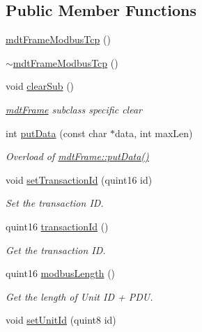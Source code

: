 \subsection*{Public Member Functions}
\begin{DoxyCompactItemize}
\item 
\hyperlink{classmdt_frame_modbus_tcp_a63e62f8cf28e0a1f4056517cbea2fa65}{mdt\-Frame\-Modbus\-Tcp} ()
\item 
\hyperlink{classmdt_frame_modbus_tcp_acebda30f8c392b14338eabc7580f286a}{$\sim$mdt\-Frame\-Modbus\-Tcp} ()
\item 
void \hyperlink{classmdt_frame_modbus_tcp_ab1545b25b4c8864056d900c8ddce2719}{clear\-Sub} ()
\begin{DoxyCompactList}\small\item\em \hyperlink{classmdt_frame}{mdt\-Frame} subclass specific clear \end{DoxyCompactList}\item 
int \hyperlink{classmdt_frame_modbus_tcp_a0f684d77c03e5fb91598c9a10715bedb}{put\-Data} (const char $\ast$data, int max\-Len)
\begin{DoxyCompactList}\small\item\em Overload of \hyperlink{classmdt_frame_ae63af784d2fc54430ea5db4dc80b7ec8}{mdt\-Frame\-::put\-Data()} \end{DoxyCompactList}\item 
void \hyperlink{classmdt_frame_modbus_tcp_a3c5528d2e45111ec0563dfd3350177cd}{set\-Transaction\-Id} (quint16 id)
\begin{DoxyCompactList}\small\item\em Set the transaction I\-D. \end{DoxyCompactList}\item 
quint16 \hyperlink{classmdt_frame_modbus_tcp_a48a7e24190190da0ae9f5dbdfcd1ee48}{transaction\-Id} ()
\begin{DoxyCompactList}\small\item\em Get the transaction I\-D. \end{DoxyCompactList}\item 
quint16 \hyperlink{classmdt_frame_modbus_tcp_a5213eb7e3670a191d2b75c83f5dd8d71}{modbus\-Length} ()
\begin{DoxyCompactList}\small\item\em Get the length of Unit I\-D + P\-D\-U. \end{DoxyCompactList}\item 
void \hyperlink{classmdt_frame_modbus_tcp_ab6bb1765abd0910c6511954a17526243}{set\-Unit\-Id} (quint8 id)

\end{DoxyCompactItemize}
